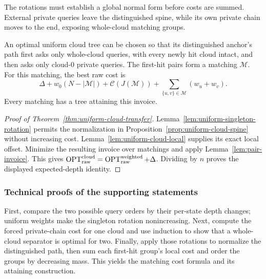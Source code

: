 The rotations must establish a global normal form before costs
are summed. External private queries leave the distinguished spine,
while its own private chain moves to the end, exposing whole-cloud
matching groups.

\begin{proposition}
\label{prop:uniform-cloud-spine}
An optimal uniform cloud tree can be chosen so that its distinguished
anchor's path first asks only whole-cloud queries, with every newly
hit cloud intact, and then asks only cloud-$0$ private queries.
The first-hit pairs form a matching $\mathcal M$. For this matching,
the best raw cost is
\[
 \Delta+w_0(N-|\mathcal M|)+\mathcal C(J(\mathcal M))
          +\sum_{\{u,v\}\in\mathcal M}(w_u+w_v).
\]
Every matching has a tree attaining this invoice.
\end{proposition}

\begin{proof}[Proof of Theorem~\ref{thm:uniform-cloud-transfer}]
Lemma~\ref{lem:uniform-singleton-rotation} permits the normalization
in Proposition~\ref{prop:uniform-cloud-spine} without increasing cost.
Lemma~\ref{lem:uniform-cloud-local} supplies its exact local offset.
Minimize the resulting invoice over matchings and apply
Lemma~\ref{lem:pair-invoice}. This gives
$\operatorname{OPT}_{\mathrm{raw}}^{\mathrm{cloud}}
=\operatorname{OPT}_{\mathrm{raw}}^{\mathrm{weighted}}+\Delta$.
Dividing by $n$ proves the displayed expected-depth identity.
\end{proof}

\subsubsection{Technical proofs of the supporting statements}

\begin{proofstrategy}
First, compare the two possible query orders by their per-state depth
changes; uniform weights make the singleton rotation nonincreasing.
Next, compute the forced private-chain cost for one cloud and use
induction to show that a whole-cloud separator is optimal for two.
Finally, apply those rotations to normalize the distinguished path,
then sum each first-hit group's local cost and order the groups by
decreasing mass. This yields the matching cost formula and its attaining
construction.
\end{proofstrategy}

